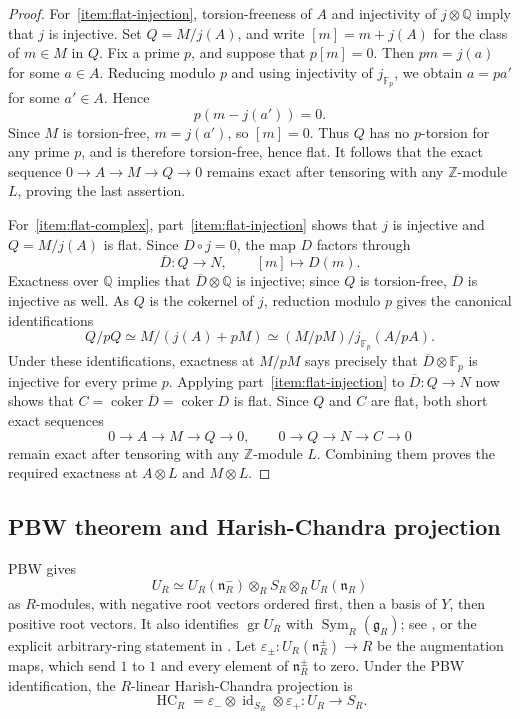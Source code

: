 \documentclass[twoside,a4paper,12pt,reqno]{amsart}
\theoremstyle{remark}
\numberwithin{equation}{section}
\newcommand{\Z}{\mathbb Z}
\newcommand{\Q}{\mathbb Q}
\newcommand{\F}{\mathbb F}
\newcommand{\fg}{\mathfrak g}
\newcommand{\fn}{\mathfrak n}
\DeclareMathOperator{\Sym}{Sym}
\DeclareMathOperator{\HC}{HC}
\DeclareMathOperator{\gr}{gr}
\begin{document}
\begin{proof}
For~\eqref{item:flat-injection}, torsion-freeness of \(A\) and injectivity of \(j\otimes\Q\) imply that \(j\) is injective. Set \(Q=M/j(A)\), and write \([m]=m+j(A)\) for the class of \(m\in M\) in \(Q\). Fix a prime \(p\), and suppose that \(p[m]=0\). Then \(pm=j(a)\) for some \(a\in A\). Reducing modulo \(p\) and using injectivity of \(j_{\F_p}\), we obtain \(a=pa'\) for some \(a'\in A\). Hence
\[
p(m-j(a'))=0.
\]
Since \(M\) is torsion-free, \(m=j(a')\), so \([m]=0\). Thus \(Q\) has no \(p\)-torsion for any prime \(p\), and is therefore torsion-free, hence flat. It follows that the exact sequence \(0\to A\to M\to Q\to0\) remains exact after tensoring with any \(\Z\)-module \(L\), proving the last assertion.

For~\eqref{item:flat-complex}, part~\eqref{item:flat-injection} shows that \(j\) is injective and \(Q=M/j(A)\) is flat. Since \(D\circ j=0\), the map \(D\) factors through
\[
\overline D:Q\longrightarrow N,\qquad [m]\longmapsto D(m).
\]
Exactness over \(\Q\) implies that \(\overline D\otimes\Q\) is injective; since \(Q\) is torsion-free, \(\overline D\) is injective as well. As \(Q\) is the cokernel of \(j\), reduction modulo \(p\) gives the canonical identifications
\[
Q/pQ\simeq M/(j(A)+pM)
\simeq (M/pM)/j_{\F_p}(A/pA).
\]
Under these identifications, exactness at \(M/pM\) says precisely that \(\overline D\otimes\F_p\) is injective for every prime \(p\). Applying part~\eqref{item:flat-injection} to \(\overline D:Q\to N\) now shows that \(C=\operatorname{coker}\overline D=\operatorname{coker}D\) is flat. Since \(Q\) and \(C\) are flat, both short exact sequences
\[
0\to A\to M\to Q\to0,\qquad
0\to Q\to N\to C\to0
\]
remain exact after tensoring with any \(\Z\)-module \(L\). Combining them proves the required exactness at \(A\otimes L\) and \(M\otimes L\).
\end{proof}

\subsection{PBW theorem and Harish-Chandra projection}

PBW gives
\[
U_R\simeq U_R(\fn_R^-)\otimes_R S_R\otimes_R U_R(\fn_R)
\]
as \(R\)-modules, with negative root vectors ordered first, then a basis of \(Y\), then positive root vectors. It also identifies \(\gr U_R\) with \(\Sym_R(\fg_R)\); see \cite[Ch.~I, \S2, no.~7, Thm.~1]{Bourbaki123}, or the explicit arbitrary-ring statement in \cite[I.1.40]{Milne}. Let \(\varepsilon_\pm:U_R(\fn_R^\pm)\to R\) be the augmentation maps, which send \(1\) to \(1\) and every element of \(\fn_R^\pm\) to zero. Under the PBW identification, the \(R\)-linear Harish-Chandra projection is
\[
\HC_R=\varepsilon_-\otimes\operatorname{id}_{S_R}\otimes\varepsilon_+:
U_R\longrightarrow S_R.
\]
\end{document}
